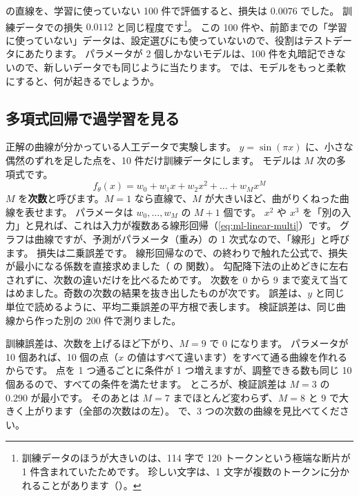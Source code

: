 の直線を、学習に使っていない 100 件で評価すると、損失は $0.0076$ でした。
訓練データでの損失 $0.0112$ と同じ程度です\footnote{訓練データのほうが大きいのは、114 字で 120 トークンという極端な断片が 1 件含まれていたためです。
珍しい文字は、1 文字が複数のトークンに分かれることがあります（）。}。
この 100 件や、前節までの「学習に使っていない」データは、設定選びにも使っていないので、役割はテストデータにあたります。
パラメータが 2 個しかないモデルは、100 件を丸暗記できないので、新しいデータでも同じように当たります。
では、モデルをもっと柔軟にすると、何が起きるでしょうか。

\subsection*{多項式回帰で過学習を見る}

正解の曲線が分かっている人工データで実験します。
$y=\sin(\pi x)$ に、小さな偶然のずれを足した点を、10 件だけ訓練データにします。
モデルは $M$ 次の多項式です。
\begin{equation}
f_\theta(x) = w_0 + w_1 x + w_2 x^2 + \dots + w_M x^M
\label{eq:ml-poly}
\end{equation}
$M$ を\textbf{次数}と呼びます。$M=1$ なら直線で、$M$ が大きいほど、曲がりくねった曲線を表せます。
パラメータは $w_0,\dots,w_M$ の $M+1$ 個です。
$x^2$ や $x^3$ を「別の入力」と見れば、これは入力が複数ある線形回帰（\eqref{eq:ml-linear-multi}）です。
グラフは曲線ですが、予測がパラメータ（重み）の 1 次式なので、「線形」と呼びます。
損失は二乗誤差です。
線形回帰なので、の終わりで触れた公式で、損失が最小になる係数を直接求めました（ の  関数）。
勾配降下法の止めどきに左右されずに、次数の違いだけを比べるためです。
次数を 0 から 9 まで変えて当てはめました。奇数の次数の結果を抜き出したものが次です。
誤差は、$y$ と同じ単位で読めるように、平均二乗誤差の平方根で表します。
検証誤差は、同じ曲線から作った別の 200 件で測りました。


訓練誤差は、次数を上げるほど下がり、$M=9$ で 0 になります。
パラメータが 10 個あれば、10 個の点（$x$ の値はすべて違います）をすべて通る曲線を作れるからです。
点を 1 つ通るごとに条件が 1 つ増えますが、調整できる数も同じ 10 個あるので、すべての条件を満たせます。
ところが、検証誤差は $M=3$ の $0.290$ が最小です。
そのあとは $M=7$ までほとんど変わらず、$M=8$ と $9$ で大きく上がります（全部の次数はの左）。
で、3 つの次数の曲線を見比べてください。

